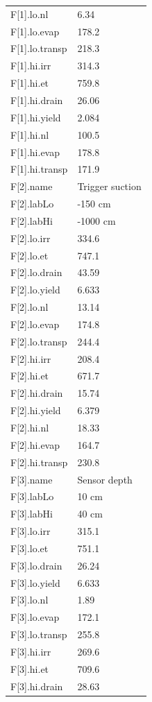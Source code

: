 {\begin{longtable}{p{}p{}}
{}F[1].lo.nl & 6.34\\
{}F[1].lo.evap & 178.2\\
{}F[1].lo.transp & 218.3\\
{}F[1].hi.irr & 314.3\\
{}F[1].hi.et & 759.8\\
{}F[1].hi.drain & 26.06\\
{}F[1].hi.yield & 2.084\\
{}F[1].hi.nl & 100.5\\
{}F[1].hi.evap & 178.8\\
{}F[1].hi.transp & 171.9\\
{}F[2].name & Trigger suction\\
{}F[2].labLo & -150 cm\\
{}F[2].labHi & -1000 cm\\
{}F[2].lo.irr & 334.6\\
{}F[2].lo.et & 747.1\\
{}F[2].lo.drain & 43.59\\
{}F[2].lo.yield & 6.633\\
{}F[2].lo.nl & 13.14\\
{}F[2].lo.evap & 174.8\\
{}F[2].lo.transp & 244.4\\
{}F[2].hi.irr & 208.4\\
{}F[2].hi.et & 671.7\\
{}F[2].hi.drain & 15.74\\
{}F[2].hi.yield & 6.379\\
{}F[2].hi.nl & 18.33\\
{}F[2].hi.evap & 164.7\\
{}F[2].hi.transp & 230.8\\
{}F[3].name & Sensor depth\\
{}F[3].labLo & 10 cm\\
{}F[3].labHi & 40 cm\\
{}F[3].lo.irr & 315.1\\
{}F[3].lo.et & 751.1\\
{}F[3].lo.drain & 26.24\\
{}F[3].lo.yield & 6.633\\
{}F[3].lo.nl & 1.89\\
{}F[3].lo.evap & 172.1\\
{}F[3].lo.transp & 255.8\\
{}F[3].hi.irr & 269.6\\
{}F[3].hi.et & 709.6\\
{}F[3].hi.drain & 28.63\\

\end{longtable}}
